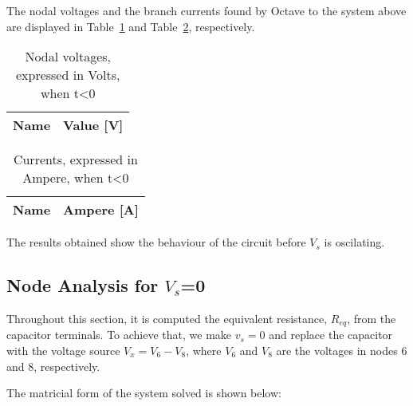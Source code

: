 The nodal voltages and the branch currents found by Octave to the system above
are displayed in Table~\ref{tab:volt1} and Table~\ref{tab:curr1}, respectively.\par

\begin{minipage}
\centering
\begin{table} [b]
  \begin{tabular}{|l|r|}
    \hline    
    {\bf Name} & {\bf Value [V]} \\ \hline
    
  \end{tabular}
  \caption{Nodal voltages, expressed in Volts, when t<0}
  \label{tab:volt1}
\end{table}
\end{minipage}
\begin{minipage}
\begin{table} [b]
  \begin{tabular}{|l|r|}
    \hline    
    {\bf Name} & {\bf Ampere [A]} \\ \hline
    
  \end{tabular}
  \caption{Currents, expressed in Ampere, when t<0}
  \label{tab:curr1}
\end{table}
\end{minipage}

The results obtained show the behaviour of the circuit before $V_s$ is oscilating.

\subsection{Node Analysis for $V_s$=0}

Throughout this section, it is computed the equivalent resistance, $R_{eq}$, from
the capacitor terminals. To achieve that, we make $v_{s}=0$ and replace the capacitor
with the voltage source $V_{x}=V_{6}-V_{8}$, where $V_6$ and $V_8$ are the voltages
in nodes 6 and 8, respectively.\par
The matricial form of the system solved is shown below:\par

